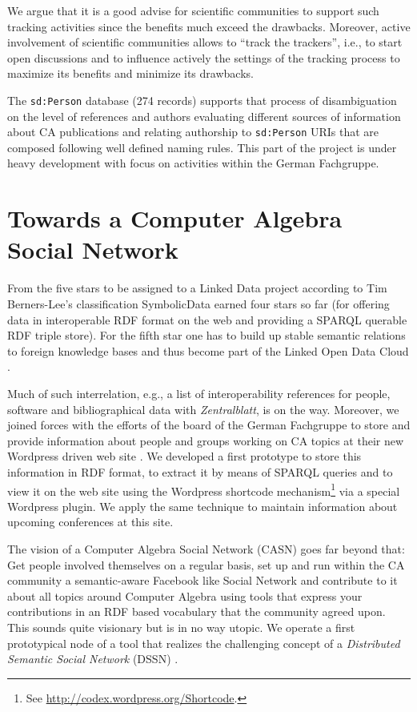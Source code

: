 \documentclass{llncs}
\newcommand{\SD}{{\sc Symbolic\-Data}}
\begin{document}
We argue that it is a good advise for scientific communities to support such
tracking activities since the benefits much exceed the drawbacks.  Moreover,
active involvement of scientific communities allows to ``track the trackers'',
i.e., to start open discussions and to influence actively the settings of the
tracking process to maximize its benefits and minimize its drawbacks.

The \texttt{sd:Person} database (274 records) supports that process of
disambiguation on the level of references and authors evaluating different
sources of information about CA publications and relating authorship to
\texttt{sd:Person} URIs that are composed following well defined naming rules.
This part of the project is under heavy development with focus on activities
within the German Fachgruppe.

\section{Towards a Computer Algebra Social Network}

From the five stars to be assigned to a Linked Data project according to Tim
Berners-Lee's classification \cite{5stars} {\SD} earned four stars so far (for
offering data in interoperable RDF format on the web and providing a SPARQL
querable RDF triple store).  For the fifth star one has to build up stable
semantic relations to foreign knowledge bases and thus become part of the
Linked Open Data Cloud \cite{lod}.

Much of such interrelation, e.g., a list of interoperability references for
people, software and bibliographical data with \emph{Zentralblatt}, is on the
way.  Moreover, we joined forces with the efforts of the board of the German
Fachgruppe to store and provide information about people and groups working on
CA topics at their new Wordpress driven web site \cite{cafg}.  We developed a
first prototype to store this information in RDF format, to extract it by
means of SPARQL queries and to view it on the web site using the Wordpress
shortcode mechanism\footnote{See \url{http://codex.wordpress.org/Shortcode}.}
via a special Wordpress plugin.  We apply the same technique to maintain
information about upcoming conferences at this site.

The vision of a Computer Algebra Social Network (CASN) goes far beyond that:
Get people involved themselves on a regular basis, set up and run within the
CA community a semantic-aware Facebook like Social Network and contribute to
it about all topics around Computer Algebra using tools that express your
contributions in an RDF based vocabulary that the community agreed upon. This
sounds quite visionary but is in no way utopic. We operate a first
prototypical node of a tool that realizes the challenging concept of a
\emph{Distributed Semantic Social Network} (DSSN) \cite{dssn}.
\end{document}
